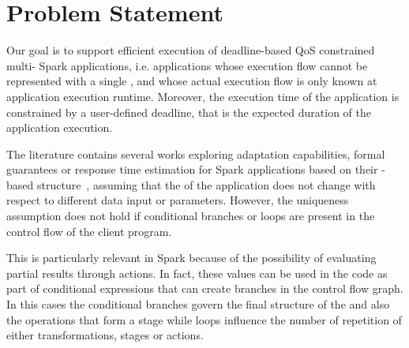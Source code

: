 \section{Problem Statement}\label{sec:problem_statement}
Our goal is to support efficient execution of deadline-based QoS constrained multi-{\plan} Spark applications, i.e. applications whose execution flow cannot be represented with a single \plan, and whose actual execution flow is only known at application execution runtime. Moreover, the execution time of the application is constrained by a user-defined deadline, that is the expected duration of the application execution.

The literature contains several works exploring adaptation capabilities, formal guarantees or response time estimation for Spark applications based on their \plan-based structure~\cite{dSpark, xsparkreport, Quattrocchi2018}, assuming that the \plan of the application does not change with respect to different data input or parameters. However, the \plan uniqueness assumption does not hold if conditional branches or loops are present in the control flow of the client program.

This is particularly relevant in Spark because of the possibility of evaluating
partial results through actions. In fact, these values can be used in the code as part of conditional expressions that can create branches in the control flow graph. In this cases the conditional branches govern the final structure of the \plan and also the operations that form a stage while loops influence the number of repetition of either transformations, stages or actions. 


